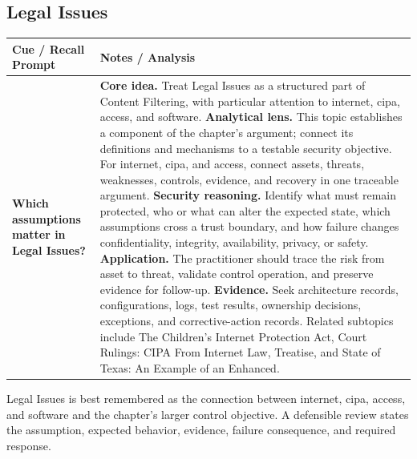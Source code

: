 \documentclass[11pt]{article}
\newcommand{\CornellHeader}{%
\rowcolor{Navy}\color{white}\bfseries Cue / Recall Prompt & \color{white}\bfseries Notes / Analysis\\\hline}
\newcommand{\CornellRow}[2]{%
\cellcolor{CueGray}\RaggedRight\textbf{#1} & \RaggedRight #2\\\hline}
\begin{document}
\subsection*{Legal Issues}
\begin{longtable}{>{\RaggedRight\arraybackslash}p{}|>{\RaggedRight\arraybackslash}p{}}
\CornellHeader
\CornellRow{Which assumptions matter in Legal Issues?}{\textbf{Core idea.} Treat Legal Issues as a structured part of Content Filtering, with particular attention to internet, cipa, access, and software. \textbf{Analytical lens.} This topic establishes a component of the chapter's argument; connect its definitions and mechanisms to a testable security objective. For internet, cipa, and access, connect assets, threats, weaknesses, controls, evidence, and recovery in one traceable argument. \textbf{Security reasoning.} Identify what must remain protected, who or what can alter the expected state, which assumptions cross a trust boundary, and how failure changes confidentiality, integrity, availability, privacy, or safety. \textbf{Application.} The practitioner should trace the risk from asset to threat, validate control operation, and preserve evidence for follow-up. \textbf{Evidence.} Seek architecture records, configurations, logs, test results, ownership decisions, exceptions, and corrective-action records. Related subtopics include The Children's Internet Protection Act, Court Rulings: CIPA From Internet Law, Treatise, and State of Texas: An Example of an Enhanced.}
\end{longtable}
\begin{topicsummary}
Legal Issues is best remembered as the connection between internet, cipa, access, and software and the chapter's larger control objective. A defensible review states the assumption, expected behavior, evidence, failure consequence, and required response.
\end{topicsummary}
\end{document}

